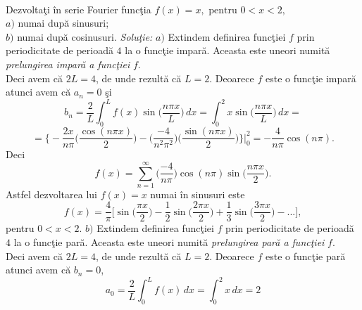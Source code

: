 \documentclass[a4paper,openany,12pt]{report}
\begin{document}
\paragraph*{}Dezvolta\c ti \^ in serie Fourier func\c tia $f(x)=x, \text{ pentru } 0<x<2,$\\
$a)$ numai dup\u a sinusuri;\\
$b)$ numai dup\u a cosinusuri.
\newline
\newline
\textit{Solu\c tie:}
\newline
$a)$ Extindem definirea func\c tiei $f$ prin periodicitate de perioad\u a $4$ la o func\c tie impar\u a. Aceasta este uneori numit\u a \textit{prelungirea impar\u a a func\c tiei} $f$.\\
\newline
Deci avem c\u a $2L=4$, de unde rezult\u a c\u a $L=2$.
Deoarece $f$ este o func\c tie impar\u a atunci avem c\u a $a_n=0$ \c si
\begin{equation*}
b_n=\frac{2}{L}\int_0^L f(x) \sin\bigg(\frac{n\pi x}{L}\bigg)\, dx=\int_0^2 x \sin\bigg(\frac{n\pi x}{L}\bigg)\, dx=
\end{equation*}
\begin{equation*}
=\bigg\{-\frac{2x}{n\pi}\bigg(\frac{\cos(n\pi x)}{2}\bigg)-\bigg(\frac{-4}{n^2\pi^2}\bigg)\bigg(\frac{\sin(n\pi x)}{2}\bigg)\bigg\}\bigg|_{0}^{2} = -\frac{4}{n\pi}\cos(n\pi).
\end{equation*}
Deci 
\begin{equation*}
f(x)=\sum_{n=1}^\infty \bigg(\frac{-4}{n\pi}\bigg)\cos(n\pi) \sin\bigg(\frac{n\pi x}{2}\bigg).
\end{equation*}
Astfel dezvoltarea lui $f(x)=x$ numai \^ in sinusuri este
\begin{equation*}
f(x)=\frac{4}{\pi}\bigg[\sin\bigg(\frac{\pi x}{2}\bigg)-\frac{1}{2}\sin\bigg(\frac{2\pi x}{2}\bigg)+\frac{1}{3}\sin\bigg(\frac{3\pi x}{2}\bigg)-...\bigg],
\end{equation*}
pentru $0<x<2$.
\newline
\newline
$b)$ Extindem definirea func\c tiei $f$ prin periodicitate de perioad\u a $4$ la o func\c tie par\u a. Aceasta este uneori numit\u a \textit{prelungirea par\u a a func\c tiei} $f$.\\
\newline
Deci avem c\u a $2L=4$, de unde rezult\u a c\u a $L=2$.
Deoarece $f$ este o func\c tie par\u a atunci avem c\u a $b_n=0$,
\begin{equation*}
a_0= \frac{2}{L}\int_0^L f(x)\, dx = \int_0^2 x\, dx =2
\end{equation*}
\end{document}
